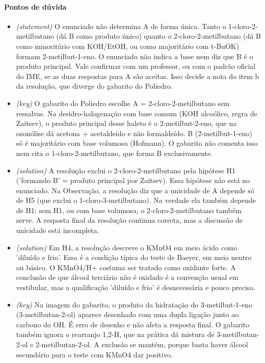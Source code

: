 \documentclass{article}%
\begin{document}
\paragraph{Pontos de dúvida}%
\begin{itemize}%
\item%
\textit{(statement)} O enunciado não determina A de forma única. Tanto o 1{-}cloro{-}2{-}metilbutano (dá B como produto único) quanto o 2{-}cloro{-}2{-}metilbutano (dá B como minoritário com KOH/EtOH, ou como majoritário com t{-}BuOK) formam 2{-}metilbut{-}1{-}eno. O enunciado não indica a base nem diz que B é o produto principal. Vale confirmar com um professor, ou com o padrão oficial do IME, se as duas respostas para A são aceitas. Isso decide a nota do item b da resolução, que diverge do gabarito do Poliedro.%
\item%
\textit{(key)} O gabarito do Poliedro escolhe A = 2{-}cloro{-}2{-}metilbutano sem ressalvas. Na desidro{-}halogenação com base comum (KOH alcoólico, regra de Zaitsev), o produto principal desse haleto é o 2{-}metilbut{-}2{-}eno, que na ozonólise dá acetona + acetaldeído e não formaldeído. B (2{-}metilbut{-}1{-}eno) só é majoritário com base volumosa (Hofmann). O gabarito não comenta isso nem cita o 1{-}cloro{-}2{-}metilbutano, que forma B exclusivamente.%
\item%
\textit{(solution)} A resolução exclui o 2{-}cloro{-}2{-}metilbutano pela hipótese H1 ('formando B' = produto principal por Zaitsev). Essa hipótese não está no enunciado. Na Observação, a resolução diz que a unicidade de A depende só de H5 (que exclui o 1{-}cloro{-}3{-}metilbutano). Na verdade ela também depende de H1: sem H1, ou com base volumosa, o 2{-}cloro{-}2{-}metilbutano também serve. A resposta final da resolução continua correta, mas a discussão de unicidade está incompleta.%
\item%
\textit{(solution)} Em H4, a resolução descreve o KMnO4 em meio ácido como 'diluído e frio'. Essa é a condição típica do teste de Baeyer, em meio neutro ou básico. O KMnO4/H+ costuma ser tratado como oxidante forte. A conclusão de que álcool terciário não é oxidado é a convenção usual em vestibular, mas a qualificação 'diluído e frio' é desnecessária e pouco precisa.%
\item%
\textit{(key)} Na imagem do gabarito, o produto da hidratação do 3{-}metilbut{-}1{-}eno (3{-}metilbutan{-}2{-}ol) aparece desenhado com uma dupla ligação junto ao carbono do OH. É erro de desenho e não afeta a resposta final. O gabarito também ignora o rearranjo 1,2{-}H, que na prática dá mistura de 3{-}metilbutan{-}2{-}ol e 2{-}metilbutan{-}2{-}ol. A exclusão se mantém, porque basta haver álcool secundário para o teste com KMnO4 dar positivo.%
\end{itemize}%
\end{document}
